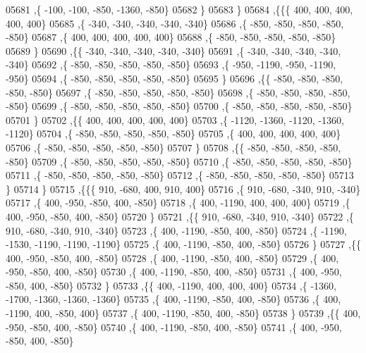 \begin{DoxyCode}
05681     ,\{  -100,  -100,  -850, -1360,  -850\}
05682     \}
05683    \}
05684   ,\{\{\{   400,   400,   400,   400,   400\}
05685     ,\{  -340,  -340,  -340,  -340,  -340\}
05686     ,\{  -850,  -850,  -850,  -850,  -850\}
05687     ,\{   400,   400,   400,   400,   400\}
05688     ,\{  -850,  -850,  -850,  -850,  -850\}
05689     \}
05690    ,\{\{  -340,  -340,  -340,  -340,  -340\}
05691     ,\{  -340,  -340,  -340,  -340,  -340\}
05692     ,\{  -850,  -850,  -850,  -850,  -850\}
05693     ,\{  -950, -1190,  -950, -1190,  -950\}
05694     ,\{  -850,  -850,  -850,  -850,  -850\}
05695     \}
05696    ,\{\{  -850,  -850,  -850,  -850,  -850\}
05697     ,\{  -850,  -850,  -850,  -850,  -850\}
05698     ,\{  -850,  -850,  -850,  -850,  -850\}
05699     ,\{  -850,  -850,  -850,  -850,  -850\}
05700     ,\{  -850,  -850,  -850,  -850,  -850\}
05701     \}
05702    ,\{\{   400,   400,   400,   400,   400\}
05703     ,\{ -1120, -1360, -1120, -1360, -1120\}
05704     ,\{  -850,  -850,  -850,  -850,  -850\}
05705     ,\{   400,   400,   400,   400,   400\}
05706     ,\{  -850,  -850,  -850,  -850,  -850\}
05707     \}
05708    ,\{\{  -850,  -850,  -850,  -850,  -850\}
05709     ,\{  -850,  -850,  -850,  -850,  -850\}
05710     ,\{  -850,  -850,  -850,  -850,  -850\}
05711     ,\{  -850,  -850,  -850,  -850,  -850\}
05712     ,\{  -850,  -850,  -850,  -850,  -850\}
05713     \}
05714    \}
05715   ,\{\{\{   910,  -680,   400,   910,   400\}
05716     ,\{   910,  -680,  -340,   910,  -340\}
05717     ,\{   400,  -950,  -850,   400,  -850\}
05718     ,\{   400, -1190,   400,   400,   400\}
05719     ,\{   400,  -950,  -850,   400,  -850\}
05720     \}
05721    ,\{\{   910,  -680,  -340,   910,  -340\}
05722     ,\{   910,  -680,  -340,   910,  -340\}
05723     ,\{   400, -1190,  -850,   400,  -850\}
05724     ,\{ -1190, -1530, -1190, -1190, -1190\}
05725     ,\{   400, -1190,  -850,   400,  -850\}
05726     \}
05727    ,\{\{   400,  -950,  -850,   400,  -850\}
05728     ,\{   400, -1190,  -850,   400,  -850\}
05729     ,\{   400,  -950,  -850,   400,  -850\}
05730     ,\{   400, -1190,  -850,   400,  -850\}
05731     ,\{   400,  -950,  -850,   400,  -850\}
05732     \}
05733    ,\{\{   400, -1190,   400,   400,   400\}
05734     ,\{ -1360, -1700, -1360, -1360, -1360\}
05735     ,\{   400, -1190,  -850,   400,  -850\}
05736     ,\{   400, -1190,   400,  -850,   400\}
05737     ,\{   400, -1190,  -850,   400,  -850\}
05738     \}
05739    ,\{\{   400,  -950,  -850,   400,  -850\}
05740     ,\{   400, -1190,  -850,   400,  -850\}
05741     ,\{   400,  -950,  -850,   400,  -850\}

\end{DoxyCode}
